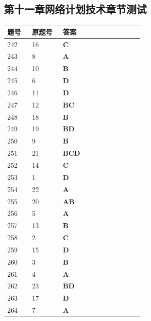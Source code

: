 \documentclass[UTF8,fontset=windows,11pt]{ctexart}
\begin{document}
\subsection*{第十一章网络计划技术章节测试}
\begin{longtable}{p{0.16\linewidth}p{0.2\linewidth}p{0.52\linewidth}}
\textbf{\textcolor{examnavy}{题号}} & \textbf{\textcolor{examnavy}{原题号}} & \textbf{\textcolor{answergreen}{答案}} \\
\hline
242 & 16 & \textbf{\textcolor{answergreen}{C}} \\
243 & 8 & \textbf{\textcolor{answergreen}{A}} \\
244 & 10 & \textbf{\textcolor{answergreen}{B}} \\
245 & 6 & \textbf{\textcolor{answergreen}{D}} \\
246 & 11 & \textbf{\textcolor{answergreen}{D}} \\
247 & 12 & \textbf{\textcolor{answergreen}{BC}} \\
248 & 18 & \textbf{\textcolor{answergreen}{B}} \\
249 & 19 & \textbf{\textcolor{answergreen}{BD}} \\
250 & 9 & \textbf{\textcolor{answergreen}{B}} \\
251 & 21 & \textbf{\textcolor{answergreen}{BCD}} \\
252 & 14 & \textbf{\textcolor{answergreen}{C}} \\
253 & 1 & \textbf{\textcolor{answergreen}{D}} \\
254 & 22 & \textbf{\textcolor{answergreen}{A}} \\
255 & 20 & \textbf{\textcolor{answergreen}{AB}} \\
256 & 5 & \textbf{\textcolor{answergreen}{A}} \\
257 & 13 & \textbf{\textcolor{answergreen}{B}} \\
258 & 2 & \textbf{\textcolor{answergreen}{C}} \\
259 & 15 & \textbf{\textcolor{answergreen}{D}} \\
260 & 3 & \textbf{\textcolor{answergreen}{B}} \\
261 & 4 & \textbf{\textcolor{answergreen}{A}} \\
262 & 23 & \textbf{\textcolor{answergreen}{BD}} \\
263 & 17 & \textbf{\textcolor{answergreen}{D}} \\
264 & 7 & \textbf{\textcolor{answergreen}{A}} \\
\end{longtable}
\end{document}
